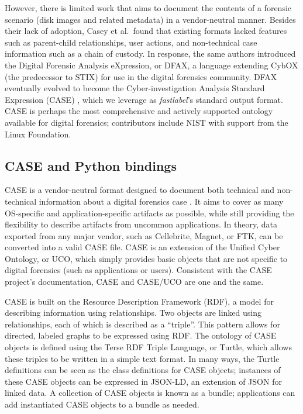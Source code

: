 However, there is limited work that aims to document the contents of a
forensic scenario (disk images and related metadata) in a vendor-neutral
manner. Besides their lack of adoption, Casey et al.~found that existing
formats lacked features such as parent-child relationships, user
actions, and non-technical case information such as a chain of custody.
In response, the same authors introduced the Digital Forensic Analysis
eXpression, or DFAX, a language extending CybOX (the predecessor to
STIX) for use in the digital forensics community. DFAX eventually
evolved to become the Cyber-investigation Analysis Standard Expression
(CASE) \cite{caseyAdvancingCoordinatedCyberinvestigations2017},
which we leverage as \emph{fastlabel}'s standard output format. CASE is
perhaps the most comprehensive and actively supported ontology available
for digital forensics; contributors include NIST with support from the
Linux Foundation.

\subsection{CASE and Python
bindings}\label{case-and-python-bindings}

CASE is a vendor-neutral format designed to document both technical and
non-technical information about a digital forensics case
\cite{caseyAdvancingCoordinatedCyberinvestigations2017}. It aims to
cover as many OS-specific and application-specific artifacts as
possible, while still providing the flexibility to describe artifacts
from uncommon applications. In theory, data exported from any major
vendor, such as Cellebrite, Magnet, or FTK, can be converted into a
valid CASE file. CASE is an extension of the Unified Cyber Ontology, or
UCO, which simply provides basic objects that are not specific to
digital forensics (such as applications or users). Consistent with the
CASE project's documentation, CASE and CASE/UCO are one and the same.

CASE is built on the Resource Description Framework (RDF), a model for
describing information using relationships. Two objects are linked using
relationships, each of which is described as a ``triple''. This pattern
allows for directed, labeled graphs to be expressed using RDF. The
ontology of CASE objects is defined using the Terse RDF Triple Language,
or Turtle, which allows these triples to be written in a simple text
format. In many ways, the Turtle definitions can be seen as the class
definitions for CASE objects; instances of these CASE objects can be
expressed in JSON-LD, an extension of JSON for linked data. A collection
of CASE objects is known as a bundle; applications can add instantiated
CASE objects to a bundle as needed.

